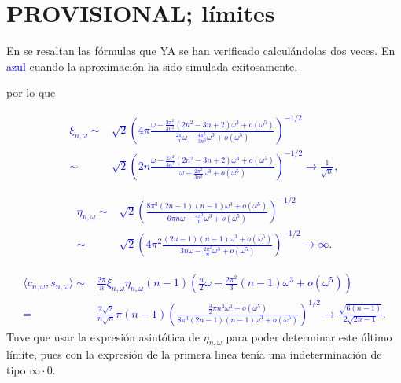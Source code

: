 \section{PROVISIONAL; límites}

En  se resaltan las fórmulas que YA se han
verificado calculándolas dos veces. En 
\textcolor{blue}{azul} cuando la aproximación ha sido
simulada exitosamente.


por lo que

\textcolor{blue}{
\begin{align*}
\xi_{n, \omega} \sim &
\sqrt{2} 
\left(
4 \pi
\frac{                                                                                                                                          
\omega - \frac{2\pi^{2}}{3n^{2}}(2n^2-3n+2)\omega^{3} + o(\omega^{5})
}{
\frac{2\pi}{n} \omega -
\frac{4 \pi^{3}}{3 n^{3}} \omega^{3} + o(\omega^{5})
}
\right)^{-1/2} \\
\sim &
\sqrt{2} 
\left(
2n
\frac{                                                                                                                                          
\omega - \frac{2\pi^{2}}{3n^{2}}(2n^2-3n+2)\omega^{3} + o(\omega^{5})
}{
\omega -
\frac{2 \pi^{2}}{3 n^{2}} \omega^{3} + o(\omega^{5})
}
\right)^{-1/2} 
\rightarrow \frac{1}{\sqrt{n}},
\end{align*}
}

\textcolor{blue}{
\begin{align*}
\eta_{n, \omega} \sim &
\sqrt{2} 
\left(
\frac{
8 \pi^{3} (2n-1)(n-1)\omega^{3} + o(\omega^{5})
}{
6 \pi n \omega -
\frac{4 \pi^{3}}{n} \omega^{3} + o(\omega^{5})
}
\right)^{-1/2} \\
\sim & 
\sqrt{2} 
\left(
4\pi^{2}
\frac{
(2n-1)(n-1)\omega^{3} + o(\omega^{5})
}{
3 n \omega -
\frac{2 \pi^{2}}{n} \omega^{3} + o(\omega^{5})
}
\right)^{-1/2} 
 \rightarrow \infty.
\end{align*}
}

\textcolor{blue}{
\begin{align*}
\langle
c_{n, \omega}, s_{n, \omega}
\rangle \sim &
\frac{2\pi}{n}
\xi_{n, \omega} \eta_{n, \omega}
(n-1)  
\left(
\frac{n}{2} \omega - \frac{2\pi^{2}}{3} (n-1) \omega^{3} + o(\omega^{5})
\right) \\
= & 
\frac{2 \sqrt{2}}{n \sqrt{n}} \pi (n-1)
\left(
\frac{
\frac{3}{2} \pi n^{3}\omega^{3} + o(\omega^{5})
}{
8 \pi^{3}(2n-1)(n-1)\omega^{3} + o(\omega^{5})
}
\right)^{1/2}
\rightarrow \frac{
\sqrt{6(n-1)}
}{2 \sqrt{2n-1}}.
\end{align*} 
}
Tuve que usar la expresión asintótica
de $\eta_{n, \omega}$ para poder determinar este
último límite, pues con la expresión de la
primera linea tenía una indeterminación
de tipo $\infty \cdot 0$.

